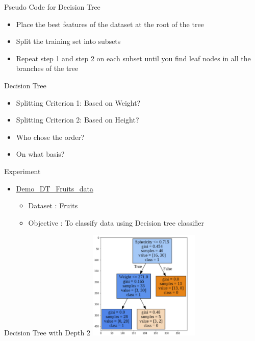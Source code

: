 \documentclass[aspectratio=169,14pt]{beamer}
\begin{document}
\begin{frame}{Pseudo Code for Decision Tree}
	\begin{tcolorbox}[width=14cm,boxrule=0pt, sharp corners,left=0pt,right=0pt,colback={blue!5!white}]
\begin{itemize}
\item Place the \alert{best} features of the dataset at the root of the tree
\item Split the training set into \alert{subsets}
\item Repeat step 1 and step 2 on each subset until you find \alert{leaf nodes} in all the branches of the tree
\end{itemize}
\end{tcolorbox}
\end{frame}




\begin{frame}{Decision Tree}
\begin{itemize}
\item Splitting Criterion 1: Based on Weight?
\item Splitting Criterion 2: Based on Height?
\item Who chose the order?
\item On what basis? 
\end{itemize}
\end{frame}


\begin{frame}{Experiment}

\begin{itemize}
\item \href{https://drive.google.com/file/d/1_WWveEZ3Os0rCU0M1Dghrvi5INsaHxyd/view?usp=sharing}{Demo\_DT\_Fruits\_data}
	\begin{itemize}
		\item Dataset : Fruits 
		\item Objective : To classify data using Decision tree classifier
	\end{itemize}
\end{itemize}
\end{frame}


\begin{frame}{Decision Tree with Depth 2}
\centering
\includegraphics[width=0.4\textwidth, height=0.7\textheight]{Images/dtree2.png}
\end{frame}
\end{document}
